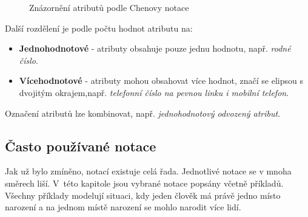 \documentclass[czech,bachelor,public,dept460,male,oneside]{diploma}
\begin{document}
		\begin{figure}[!h]
			\centering
			\caption[Znázornění atributů podle Chenovy notace]{Znázornění atributů podle Chenovy notace}
		\end{figure}
	
		Další rozdělení je podle počtu hodnot atributu na:
	
		\begin{itemize}
			\item \textbf{Jednohodnotové} - atributy obsahuje pouze jednu hodnotu, např. \textit{rodné číslo}.
			\item \textbf{Vícehodnotové} - atributy mohou obsahovat více hodnot, značí se elipsou s dvojitým okrajem,např. \textit{telefonní číslo na pevnou linku i mobilní telefon}.
		\end{itemize}
			
		Označení atributů lze kombinovat, např. \textit{jednohodnotový odvozený atribut}.
		
	\subsection{Často používané notace} \label{secOftenNotation}
	Jak už bylo zmíněno, notací existuje celá řada. Jednotlivé notace se v mnoha směrech liší. V~této kapitole jsou vybrané notace popsány včetně příkladů. Všechny příklady modelují situaci, kdy jeden člověk má právě jedno místo narození a na jednom místě narození se mohlo narodit více lidí.
	
\end{document}
